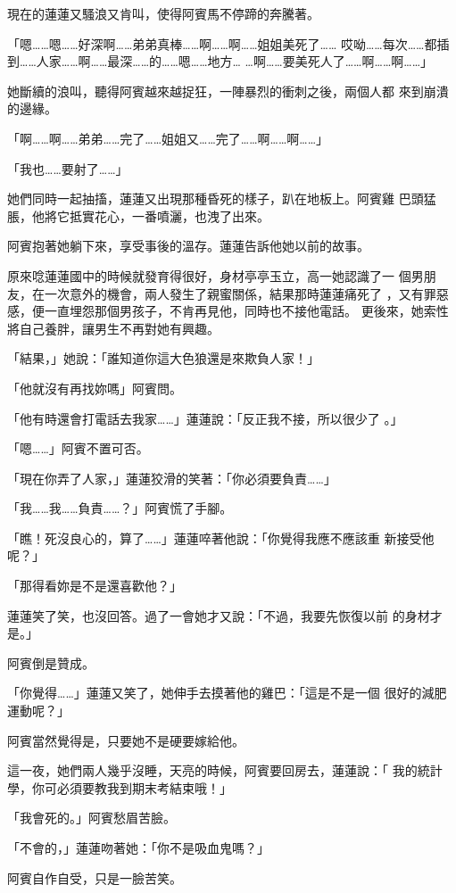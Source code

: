 現在的蓮蓮又騷浪又肯叫，使得阿賓馬不停蹄的奔騰著。

「嗯……嗯……好深啊……弟弟真棒……啊……啊……姐姐美死了……
哎呦……每次……都插到……人家……啊……最深……的……嗯……地方…
…啊……要美死人了……啊……啊……」

她斷續的浪叫，聽得阿賓越來越捉狂，一陣暴烈的衝刺之後，兩個人都
來到崩潰的邊緣。

「啊……啊……弟弟……完了……姐姐又……完了……啊……啊……」

「我也……要射了……」

她們同時一起抽搐，蓮蓮又出現那種昏死的樣子，趴在地板上。阿賓雞
巴頭猛脹，他將它抵實花心，一番噴灑，也洩了出來。

阿賓抱著她躺下來，享受事後的溫存。蓮蓮告訴他她以前的故事。

原來唸蓮蓮國中的時候就發育得很好，身材亭亭玉立，高一她認識了一
個男朋友，在一次意外的機會，兩人發生了親蜜關係，結果那時蓮蓮痛死了
，又有罪惡感，便一直埋怨那個男孩子，不肯再見他，同時也不接他電話。
更後來，她索性將自己養胖，讓男生不再對她有興趣。

「結果，」她說：「誰知道你這大色狼還是來欺負人家！」

「他就沒有再找妳嗎」阿賓問。

「他有時還會打電話去我家……」蓮蓮說：「反正我不接，所以很少了
。」

「嗯……」阿賓不置可否。

「現在你弄了人家，」蓮蓮狡滑的笑著：「你必須要負責……」

「我……我……負責……？」阿賓慌了手腳。

「瞧！死沒良心的，算了……」蓮蓮啐著他說：「你覺得我應不應該重
新接受他呢？」

「那得看妳是不是還喜歡他？」

蓮蓮笑了笑，也沒回答。過了一會她才又說：「不過，我要先恢復以前
的身材才是。」

阿賓倒是贊成。

「你覺得……」蓮蓮又笑了，她伸手去摸著他的雞巴：「這是不是一個
很好的減肥運動呢？」

阿賓當然覺得是，只要她不是硬要嫁給他。

這一夜，她們兩人幾乎沒睡，天亮的時候，阿賓要回房去，蓮蓮說：「
我的統計學，你可必須要教我到期末考結束哦！」

「我會死的。」阿賓愁眉苦臉。

「不會的，」蓮蓮吻著她：「你不是吸血鬼嗎？」

阿賓自作自受，只是一臉苦笑。










